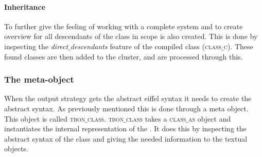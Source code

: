 \paragraph{Inheritance}
To further give the feeling of working with a complete system and to create overview \bon{} for all descendants of the class in scope is also created. This is done by inspecting the \textit{direct$\_$descendants} feature of the compiled class (\textsc{class$\_$c}). These found classes are then added to the cluster, and are processed through this.

\subsubsection{The meta-object}
\label{tbon_class}
When the output strategy gets the abstract eiffel syntax it needs to create the abstract syntax. As previously mentioned this is done through a meta object. This object is called \textsc{tbon$\_$class}. \textsc{tbon$\_$class} takes a \textsc{class$\_$as} object and instantiates the internal representation of the \bon{}. It does this by inspecting the abstract syntax of the class and giving the needed information to the textual \bon{} objects.
